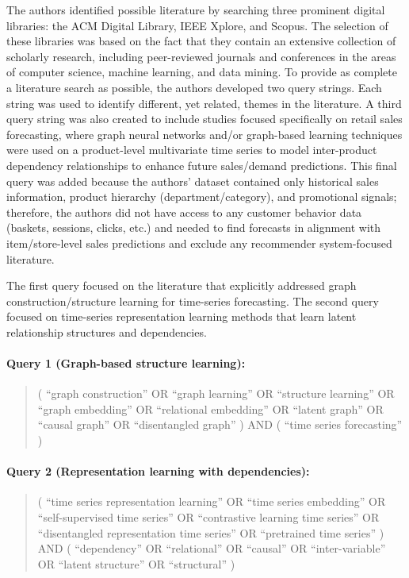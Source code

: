 The authors identified possible literature by searching three prominent digital libraries: the ACM Digital Library, IEEE Xplore, and Scopus. The selection of these libraries was based on the fact that they contain an extensive collection of scholarly research, including peer-reviewed journals and conferences in the areas of computer science, machine learning, and data mining. To provide as complete a literature search as possible, the authors developed two query strings. Each string was used to identify different, yet related, themes in the literature. A third query string was also created to include studies focused specifically on retail sales forecasting, where graph neural networks and/or graph-based learning techniques were used on a product-level multivariate time series to model inter-product dependency relationships to enhance future sales/demand predictions. This final query was added because the authors' dataset contained only historical sales information, product hierarchy (department/category), and promotional signals; therefore, the authors did not have access to any customer behavior data (baskets, sessions, clicks, etc.) and needed to find forecasts in alignment with item/store-level sales predictions and exclude any recommender system-focused literature.

The first query focused on the literature that explicitly addressed graph construction/structure learning for time-series forecasting. The second query focused on time-series representation learning methods that learn latent relationship structures and dependencies.

\paragraph{Query 1 (Graph-based structure learning):}
\begin{quote}
( ``graph construction'' OR ``graph learning'' OR ``structure learning'' OR ``graph embedding'' OR
``relational embedding'' OR ``latent graph'' OR ``causal graph'' OR ``disentangled graph'' )
AND
( ``time series forecasting'' )
\end{quote}

\paragraph{Query 2 (Representation learning with dependencies):}
\begin{quote}
( ``time series representation learning'' OR ``time series embedding'' OR
``self-supervised time series'' OR ``contrastive learning time series'' OR
``disentangled representation time series'' OR ``pretrained time series'' )
AND
( ``dependency'' OR ``relational'' OR ``causal'' OR ``inter-variable'' OR
``latent structure'' OR ``structural'' )
\end{quote}


